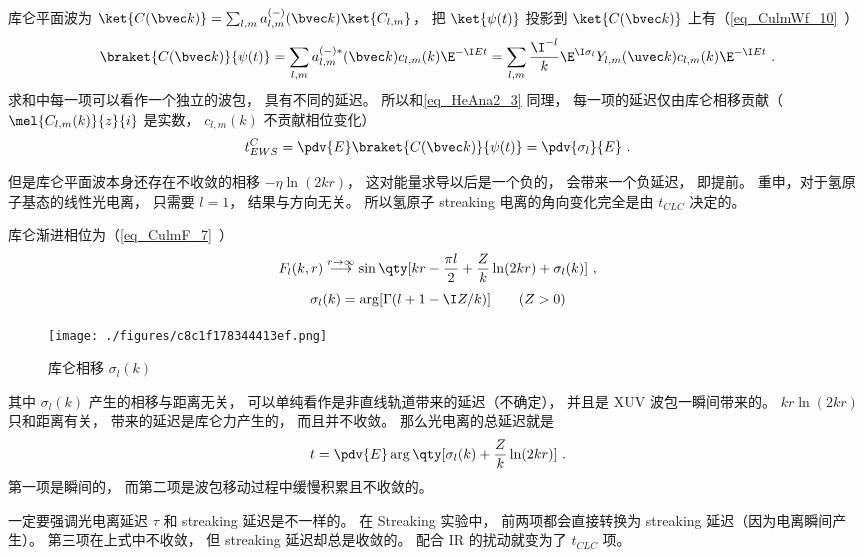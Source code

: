 库仑平面波为 $\ket{C(\bvec k)} = \sum_{l,m} a_{l,m}^{(-)}(\bvec k) \ket{C_{l,m}}$， 把 $\ket{\psi(t)}$ 投影到 $\ket{C(\bvec k)}$ 上有（\autoref{eq_CulmWf_10}~）
\begin{equation}
\braket{C(\bvec k)}{\psi(t)} = \sum_{l,m} a_{l,m}^{(-)*}(\bvec k) c_{l,m}(k) \E^{-\I E t} 
= \sum_{l,m} \frac{\I^{-l}}{k} \E^{\I\sigma_l} Y_{l,m} (\uvec k) c_{l,m}(k) \E^{-\I E t}~.
\end{equation}
求和中每一项可以看作一个独立的波包， 具有不同的延迟。 所以和\autoref{eq_HeAna2_3} 同理， 每一项的延迟仅由库仑相移贡献（$\mel{C_{l,m}(k)}{z}{i}$ 是实数， $c_{l,m}(k)$ 不贡献相位变化）
\begin{equation}
t_{EWS}^C = \pdv{E} \braket{C(\bvec k)}{\psi(t)} = \pdv{\sigma_l}{E}~.
\end{equation}

但是库仑平面波本身还存在不收敛的相移 $-\eta\ln (2kr)$， 这对能量求导以后是一个负的， 会带来一个负延迟， 即提前。 重申，对于氢原子基态的线性光电离， 只需要 $l = 1$， 结果与方向无关。 所以氢原子 streaking 电离的角向变化完全是由 $t_{CLC}$ 决定的。

库仑渐进相位为（\autoref{eq_CulmF_7}~）
\begin{equation}
F_l(k, r) \overset{r\to \infty}{\longrightarrow} \sin\qty[kr - \frac{\pi l}{2} + \frac{Z}{k}\ln(2kr) + \sigma_l(k)]~, %
\end{equation}
\begin{equation}
\sigma_l(k) = \arg[\Gamma(l+1-\I Z/k)] \qquad (Z > 0)
\end{equation}
\begin{figure}[ht]
\centering
\texttt{[image: ./figures/c8c1f178344413ef.png]}
\caption{库仑相移 $\sigma_l(k)$} \label{fig_HeAna2_1}
\end{figure}
其中 $\sigma_l(k)$ 产生的相移与距离无关， 可以单纯看作是非直线轨道带来的延迟（不确定）， 并且是 XUV 波包一瞬间带来的。 $kr\ln(2kr)$ 只和距离有关， 带来的延迟是库仑力产生的， 而且并不收敛。 那么光电离的总延迟就是
\begin{equation}\label{eq_HeAna2_5}
t = \pdv{E} \arg\qty[\sigma_l(k) + \frac{Z}{k}\ln(2kr)]~. %
\end{equation}
第一项是瞬间的， 而第二项是波包移动过程中缓慢积累且不收敛的。

一定要强调光电离延迟 $\tau$ 和 streaking 延迟是不一样的。 在 Streaking 实验中， 前两项都会直接转换为 streaking 延迟（因为电离瞬间产生）。 第三项在上式中不收敛， 但 streaking 延迟却总是收敛的。 配合 IR 的扰动就变为了 $t_{CLC}$ 项。

